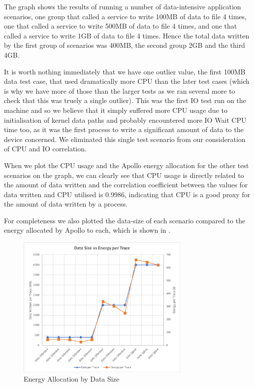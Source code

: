 The graph shows the results of running a number of data-intensive application scenarios, one group that called a service to write 100MB of data to file 4 times, one that called a service to write 500MB of data to file 4 times, and one that called a service to write 1GB of data to file 4 times.  Hence the total data written by the first group of scenarios was 400MB, the second group 2GB and the third 4GB.

It is worth nothing immediately that we have one outlier value, the first 100MB data test case, that used dramatically more CPU than the later test cases (which is why we have more of those than the larger tests as we ran several more to check that this was truely a single outlier).  This was the first IO test run on the machine and so we believe that it simply suffered more CPU usage due to initialisation of kernel data paths and probably encountered more IO Wait CPU time too, as it was the first process to write a significant amount of data to the device concerned.  We eliminated this single test scenario from our consideration of CPU and IO correlation.

When we plot the CPU usage and the Apollo energy allocation for the other test scenarios on the graph, we can clearly see that CPU usage is directly related to the amount of data written and the correlation coefficient between the values for data written and CPU utilised is 0.9986, indicating that CPU is a good proxy for the amount of data written by a process.

For completeness we also plotted the data-size of each scenario compared to the energy allocated by Apollo to each, which is shown in .  

\begin{figure}
\centering
\includegraphics[width=0.75\textwidth]{Figures/validation-energybydatasize}
\caption{Energy Allocation by Data Size}
\label{figure:validation-energybydatasize}
\end{figure}

